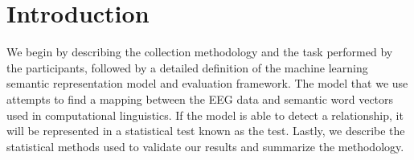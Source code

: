 \section{Introduction}

We begin by describing the collection methodology and the task performed by the participants, followed by a detailed definition of the machine learning semantic representation model and evaluation framework. The model that we use attempts to find a mapping between the EEG data and semantic word vectors used in computational linguistics. If the model is able to detect a relationship, it will be represented in a statistical test known as the \tvt test. Lastly, we describe the statistical methods used to validate our results and summarize the methodology.

